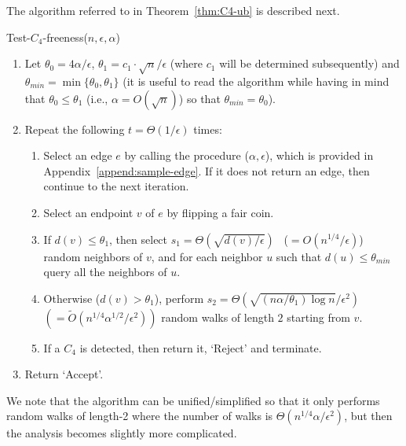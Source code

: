 \documentclass{article}
\newcommand{\eps}{\epsilon}
\newcommand{\commentt}[1]{ {}}
\newcommand{\SelectEdge}{\hyperref[alg:select-edge]{\color{black}{\sf Select-an-Edge}}}
\begin{document}

The algorithm referred to in Theorem~\ref{thm:C4-ub} is described next. 

\medskip\noindent
\textsf{Test-$C_4$-freeness}($n,\epsilon,\alpha$)\label{alg:C4}
\begin{enumerate}
\item Let $\theta_0 = 4\alpha/\epsilon$,
$\theta_1 = c_1\cdot \sqrt{n}/\eps$ (where %
$c_1$ will be determined subsequently) and $\theta_{min}=\min\{\theta_0, \theta_1\}$  (it is useful to read the algorithm while having in mind that $\theta_0\leq \theta_1$ (i.e., $\alpha = O(\sqrt{n})$) so that $\theta_{min}=\theta_0$).
\label{step:set_params_C4}
\item Repeat the following $t=\Theta(1/\epsilon)$ times:
  \begin{enumerate}
     \item Select an edge $e$ by calling the procedure \SelectEdge($\alpha,\epsilon$), which is provided in Appendix~\ref{append:sample-edge}.  If it
     does not return an edge, then continue to the next iteration.
     \item Select an endpoint $v$ of $e$ by flipping a fair coin.
     \item \label{step:random-neighbors} If $d(v) \leq \theta_1$, then select $s_1=\Theta( \sqrt{d(v)/\eps})$ ~($=O(n^{1/4}/\eps)$) random neighbors of $v$, and for each neighbor $u$ such that  
     $d(u) \leq \theta_{min}$
     query all the neighbors of $u$. 
     \item \label{step:random-walk} Otherwise ($d(v) > \theta_1$), perform $s_2=\Theta(\sqrt{  (n\alpha/\theta_1)\log n}/\eps^2)$ 
      \;$(=\tilde{O}(n^{1/4}\alpha^{1/2}/\eps^2))$ 
     random walks of length $2$ starting from $v$. 
     \item If a $C_4$ is detected, then return it, `Reject' and terminate.
  \end{enumerate}
  \item Return `Accept'.
\end{enumerate}
We note that the algorithm can be unified/simplified so that it only performs random walks of length-2 
where the number of walks is $\Theta(n^{1/4}\alpha/\eps^2)$, %
but then the analysis becomes slightly more complicated. %
\end{document}

